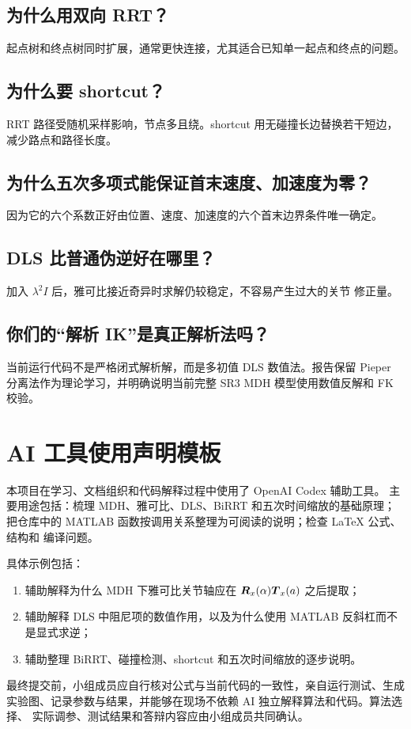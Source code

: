 \subsection*{为什么用双向 RRT？}
起点树和终点树同时扩展，通常更快连接，尤其适合已知单一起点和终点的问题。

\subsection*{为什么要 shortcut？}
RRT 路径受随机采样影响，节点多且绕。shortcut 用无碰撞长边替换若干短边，
减少路点和路径长度。

\subsection*{为什么五次多项式能保证首末速度、加速度为零？}
因为它的六个系数正好由位置、速度、加速度的六个首末边界条件唯一确定。

\subsection*{DLS 比普通伪逆好在哪里？}
加入 $\lambda^2I$ 后，雅可比接近奇异时求解仍较稳定，不容易产生过大的关节
修正量。

\subsection*{你们的“解析 IK”是真正解析法吗？}
当前运行代码不是严格闭式解析解，而是多初值 DLS 数值法。报告保留 Pieper
分离法作为理论学习，并明确说明当前完整 SR3 MDH 模型使用数值反解和 FK 校验。

\section{AI 工具使用声明模板}

本项目在学习、文档组织和代码解释过程中使用了 OpenAI Codex 辅助工具。
主要用途包括：梳理 MDH、雅可比、DLS、BiRRT 和五次时间缩放的基础原理；
把仓库中的 MATLAB 函数按调用关系整理为可阅读的说明；检查 LaTeX 公式、结构和
编译问题。

具体示例包括：
\begin{enumerate}
  \item 辅助解释为什么 MDH 下雅可比关节轴应在
  $\boldsymbol{R}_x(\alpha)\boldsymbol{T}_x(a)$ 之后提取；
  \item 辅助解释 DLS 中阻尼项的数值作用，以及为什么使用 MATLAB
  反斜杠而不是显式求逆；
  \item 辅助整理 BiRRT、碰撞检测、shortcut 和五次时间缩放的逐步说明。
\end{enumerate}

最终提交前，小组成员应自行核对公式与当前代码的一致性，亲自运行测试、生成
实验图、记录参数与结果，并能够在现场不依赖 AI 独立解释算法和代码。算法选择、
实际调参、测试结果和答辩内容应由小组成员共同确认。
